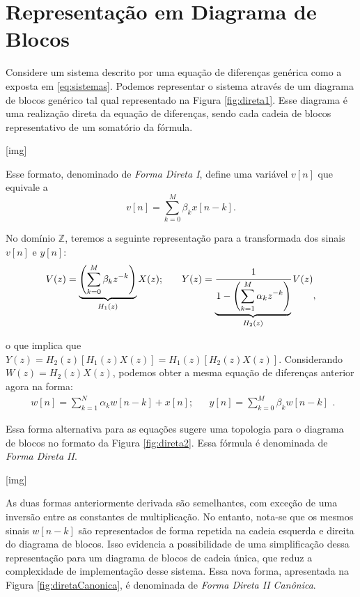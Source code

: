 \documentclass[11pt]{article}
\begin{document}
\section{Representação em Diagrama de Blocos} 

Considere um sistema descrito por uma equação de diferenças genérica como a exposta em \eqref{eq:sistemas}. Podemos representar o sistema através de um diagrama de blocos genérico tal qual representado na Figura \ref{fig:direta1}. Esse diagrama é uma realização direta da equação de diferenças, sendo cada cadeia de blocos representativo de um somatório da fórmula.

[img]

Esse formato, denominado de \textit{Forma Direta I}, define uma variável $v[n]$ que equivale a
\begin{equation}
	v[n] = \sum_{k=0}^{M} \beta_k x[n-k].
\end{equation}

\noindent No domínio $\mathbb{Z}$, teremos a seguinte representação para a transformada dos sinais $v[n]$ e $y[n]$:
\begin{equation}
\begin{matrix}
	V(z) = \underbrace{\left( \displaystyle\sum_{k=0}^M \beta_k z^{-k} \right)}_{H_1(z)} X(z); & & Y(z) = \underbrace{\cfrac{1}{1 - \left( \displaystyle\sum_{k=1}^M \alpha_k z^{-k} \right)} }_{H_2(z)} V(z)
\end{matrix},
\end{equation}

\noindent o que implica que $Y(z) = H_2(z) \left[ H_1(z) X(z) \right] = H_1(z) \left[ H_2(z) X(z) \right]$. Considerando $W(z) = H_2(z) X(z)$, podemos obter a mesma equação de diferenças anterior agora na forma:
\begin{equation}
\begin{matrix}
	w[n] = \displaystyle\sum_{k=1}^N \alpha_k w[n-k] + x[n]; & & y[n] = \displaystyle\sum_{k=0}^M \beta_k w[n-k]
\end{matrix}.
\end{equation} 

\noindent Essa forma alternativa para as equações sugere uma topologia para o diagrama de blocos no formato da Figura \ref{fig:direta2}. Essa fórmula é denominada de \textit{Forma Direta II}.

[img]

As duas formas anteriormente derivada são semelhantes, com exceção de uma inversão entre as constantes de multiplicação. No entanto, nota-se que os mesmos sinais $w[n-k]$ são representados de forma repetida na cadeia esquerda e direita do diagrama de blocos. Isso evidencia a possibilidade de uma simplificação dessa representação para um diagrama de blocos de cadeia única, que reduz a complexidade de implementação desse sistema. Essa nova forma, apresentada na Figura \ref{fig:diretaCanonica}, é denominada de \textit{Forma Direta II Canônica}.
\end{document}
